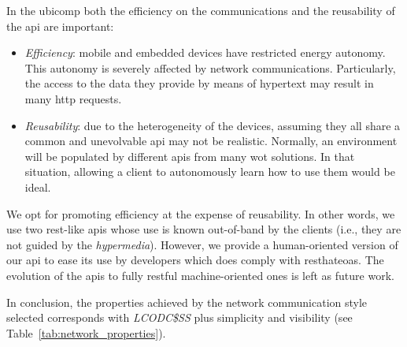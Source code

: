 


In the \ac{ubicomp} both the efficiency on the communications and the reusability of the \ac{api} are important:
\begin{itemize}
  \item \emph{Efficiency}: mobile and embedded devices have restricted energy autonomy.
                    This autonomy is severely affected by network communications. %
                    Particularly, the access to the data they provide by means of hypertext may result in many \ac{http} requests. %
  \item \emph{Reusability}: due to the heterogeneity of the devices, assuming they all share a common and unevolvable \ac{api} may not be realistic.
			    Normally, an environment will be populated by different \acp{api} from many \ac{wot} solutions.
			    In that situation, allowing a client to autonomously learn how to use them would be ideal.
\end{itemize}


We opt for promoting efficiency at the expense of reusability.
In other words, we use two \ac{rest}-like \acp{api} whose use is known out-of-band by the clients (i.e., they are not guided by the \emph{hypermedia}). %
However, we provide a human-oriented version of our \ac{api} to ease its use by developers which does comply with \ac{resthateoas}.%
The evolution of the \acp{api} to fully \ac{rest}ful machine-oriented ones is left as future work. %

\bigskip

In conclusion, the properties achieved by the network communication style selected corresponds with \emph{LCODC\$SS} plus simplicity and visibility (see Table~\ref{tab:network_properties}). %

